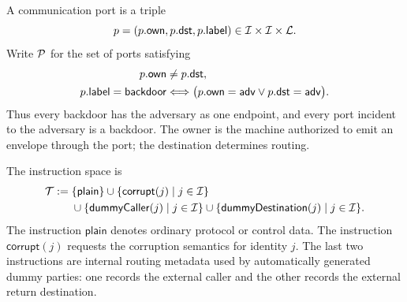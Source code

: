 \begin{definition}
\label{def:uc-comm-port}
\leanok
A communication port is a triple
\[
  p=(p.\mathsf{own},p.\mathsf{dst},p.\mathsf{label})
  \in\mathcal{I}\times\mathcal{I}\times\mathcal{L}.
\]
Write \(\mathcal{P}\) for the set of ports satisfying
\[
\begin{aligned}
  p.\mathsf{own}&\ne p.\mathsf{dst},\\
  p.\mathsf{label}=\mathsf{backdoor}
  &\Longleftrightarrow
  \bigl(p.\mathsf{own}=\mathsf{adv}\lor p.\mathsf{dst}=\mathsf{adv}\bigr).
\end{aligned}
\]
Thus every backdoor has the adversary as one endpoint, and every port incident
to the adversary is a backdoor.  The owner is the machine authorized to emit an
envelope through the port; the destination determines routing.
\end{definition}

\begin{definition}
\label{def:uc-message-instruction}
\leanok
The instruction space is
\[
\begin{aligned}
  \mathcal{T}:=\;&\{\mathsf{plain}\}
  \cup\{\mathsf{corrupt}(j)\mid j\in\mathcal{I}\}\\
  &\cup\{\mathsf{dummyCaller}(j)\mid j\in\mathcal{I}\}
  \cup\{\mathsf{dummyDestination}(j)\mid j\in\mathcal{I}\}.
\end{aligned}
\]
The instruction \(\mathsf{plain}\) denotes ordinary protocol or control data.
The instruction \(\mathsf{corrupt}(j)\) requests the corruption semantics for
identity \(j\).  The last two instructions are internal routing metadata used
by automatically generated dummy parties: one records the external caller and
the other records the external return destination.
\end{definition}

